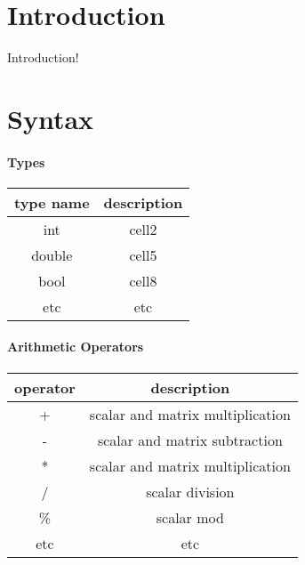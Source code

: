 \documentclass[12pt]{article}
\begin{document}
\maketitle

\section{Introduction}
Introduction!


\section{Syntax}

\paragraph{Types}

\begin{center}
\begin{tabular}{ c | c } 

  type name & description \\
 \hline
 int 		& 		cell2 \\ 
 double	& 		cell5 \\ 
 bool		& 		cell8 \\
 etc		&		etc \\
  
\end{tabular}
\end{center}

\paragraph{Arithmetic Operators}
\begin{center}
\begin{tabular}{ c | c } 

  operator & description \\
 \hline
 + 		& 		scalar and matrix multiplication \\ 
 -		& 		scalar and matrix subtraction \\ 
 \**	& 		scalar and matrix multiplication \\
 / 		& 		scalar division \\ 
 \%	& 		scalar mod \\ 
 etc	&		etc \\
 
\end{tabular}
\end{center}
\end{document}
